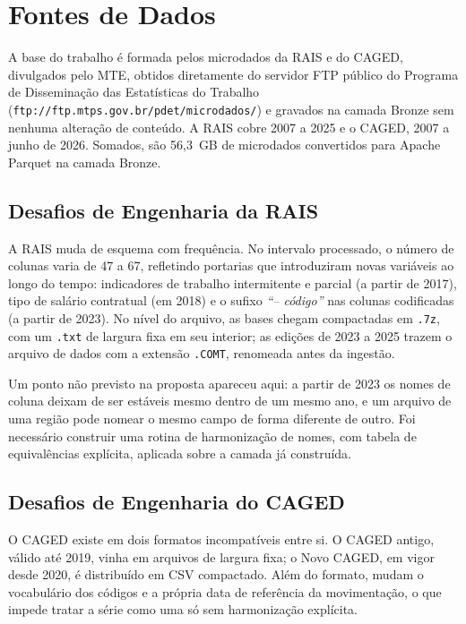 \section{Fontes de Dados}

A base do trabalho é formada pelos microdados da RAIS e do CAGED, divulgados pelo MTE, obtidos diretamente do servidor FTP público do Programa de Disseminação das Estatísticas do Trabalho (\nolinkurl{ftp://ftp.mtps.gov.br/pdet/microdados/}) e gravados na camada Bronze sem nenhuma alteração de conteúdo. A RAIS cobre 2007 a 2025 e o CAGED, 2007 a junho de 2026. Somados, são 56,3~GB de microdados convertidos para Apache Parquet na camada Bronze.

\subsection{Desafios de Engenharia da RAIS}

A RAIS muda de esquema com frequência. No intervalo processado, o número de colunas varia de 47 a 67, refletindo portarias que introduziram novas variáveis ao longo do tempo: indicadores de trabalho intermitente e parcial (a partir de 2017), tipo de salário contratual (em 2018) e o sufixo \textit{``-- código''} nas colunas codificadas (a partir de 2023). No nível do arquivo, as bases chegam compactadas em \texttt{.7z}, com um \texttt{.txt} de largura fixa em seu interior; as edições de 2023 a 2025 trazem o arquivo de dados com a extensão \texttt{.COMT}, renomeada antes da ingestão.

Um ponto não previsto na proposta apareceu aqui: a partir de 2023 os nomes de coluna deixam de ser estáveis mesmo dentro de um mesmo ano, e um arquivo de uma região pode nomear o mesmo campo de forma diferente de outro. Foi necessário construir uma rotina de harmonização de nomes, com tabela de equivalências explícita, aplicada sobre a camada já construída.

\subsection{Desafios de Engenharia do CAGED}

O CAGED existe em dois formatos incompatíveis entre si. O CAGED antigo, válido até 2019, vinha em arquivos de largura fixa; o Novo CAGED, em vigor desde 2020, é distribuído em CSV compactado. Além do formato, mudam o vocabulário dos códigos e a própria data de referência da movimentação, o que impede tratar a série como uma só sem harmonização explícita.

